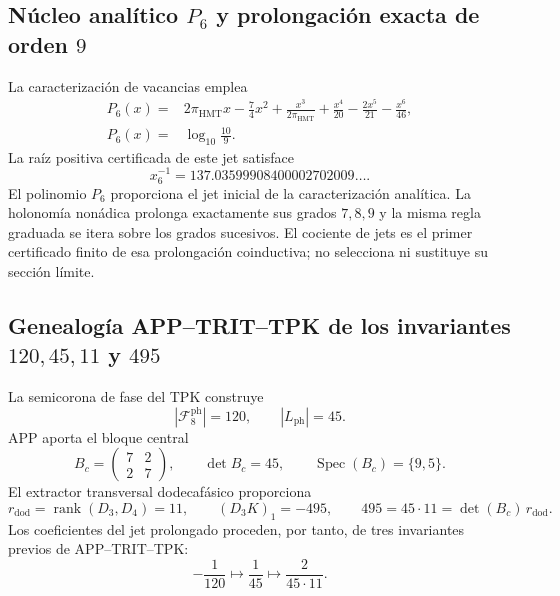 \subsection{Núcleo analítico \texorpdfstring{\(P_6\)}{P6} y prolongación exacta de orden \texorpdfstring{\(9\)}{9}}
\label{sec:l9s102:alpha-p6}

La caracterización de vacancias emplea
\begin{equation}
 \begin{aligned}
 P_6(x)={}&2\pi_{\mathrm{HMT}}x-\frac74x^2
 +\frac{x^3}{2\pi_{\mathrm{HMT}}}
 +\frac{x^4}{20}-\frac{2x^5}{21}-\frac{x^6}{46},\\
 P_6(x)={}&\log_{10}\frac{10}{9}.
 \end{aligned}
 \label{eq:l9s102:p6}
\end{equation}
La raíz positiva certificada de este jet satisface
\begin{equation}
 x_6^{-1}=137.03599908400002702009\ldots .
 \label{eq:l9s102:raíz-p6}
\end{equation}
El polinomio \(P_6\) proporciona el jet inicial de la caracterización
analítica. La holonomía nonádica prolonga exactamente sus grados \(7,8,9\) y
la misma regla graduada se itera sobre los grados sucesivos. El cociente de
jets es el primer certificado finito de esa prolongación coinductiva; no
selecciona ni sustituye su sección límite.

\subsection{Genealogía APP--TRIT--TPK de los invariantes \texorpdfstring{\(120,45,11\)}{120, 45, 11} y \texorpdfstring{\(495\)}{495}}
\label{sec:l9s102:alpha-genealogia-7-9}

La semicorona de fase del TPK construye
\begin{equation}
 |\mathcal F_8^{\mathrm{ph}}|=120,
 \qquad |L_{\mathrm{ph}}|=45.
 \label{eq:l9s102:alpha-120-45}
\end{equation}
APP aporta el bloque central
\begin{equation}
 B_c=\begin{pmatrix}7&2\\2&7\end{pmatrix},
 \qquad
 \det B_c=45,
 \qquad
 \operatorname{Spec}(B_c)=\{9,5\}.
 \label{eq:l9s102:alpha-bc}
\end{equation}
El extractor transversal dodecafásico proporciona
\begin{equation}
 r_{\mathrm{dod}}=\operatorname{rank}(D_3,D_4)=11,
 \qquad
 (D_3K)_1=-495,
 \qquad
 495=45\cdot11=\det(B_c)\,r_{\mathrm{dod}}.
 \label{eq:l9s102:alpha-495}
\end{equation}
Los coeficientes del jet prolongado proceden, por tanto, de tres
invariantes previos de APP--TRIT--TPK:
\begin{equation}
 -\frac1{120}\longmapsto\frac1{45}
 \longmapsto\frac2{45\cdot11}.
 \label{eq:l9s102:alpha-coeficientes}
\end{equation}

